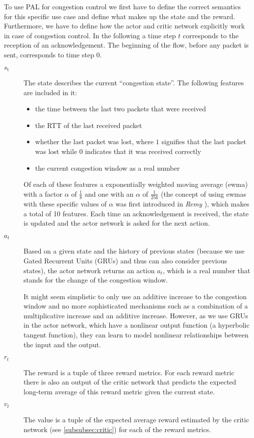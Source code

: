 \documentclass[sigconf]{acmart}
\begin{document}
To use PAL for congestion control we first have to define the correct semantics for this specific use case and define what makes up the state and the reward. Furthermore, we have to define how the actor and critic network explicitly work in case of congestion control. In the following a time step $t$ corresponds to the reception of an acknowledgement. The beginning of the flow, before any packet is sent, corresponds to time step $0$.

\begin{description}
\item[$\textit{s}_\text{t}$] The state  describes the current ``congestion state''. The following features are included in it:
\begin{itemize}
\item the time between the last two packets that were received
\item the RTT of the last received packet
\item whether the last packet was lost, where $1$ signifies that the last packet was lost while $0$ indicates that it was received correctly
\item the current congestion window as a real number
\end{itemize}
Of each of these features a exponentially weighted moving average (ewma) with a factor $\alpha$ of $\frac{1}{8}$ and one with an $\alpha$ of $\frac{1}{256}$ (the concept of using ewmas with these specific values of $\alpha$ was first introduced in \textit{Remy} \cite{winstein_tcp_2013}), which makes a total of 10 features.  
Each time an acknowledgement is received, the state is updated and the actor network is asked for the next action.
\item[$\textit{a}_t$] Based on a given state and the history of previous states (because we use Gated Recurrent Units (GRUs) and thus can also consider previous states), the actor network returns an action $a_t$, which is a real number that stands for the change of the congestion window. 

It might seem simplistic to only use an additive increase to the congestion window and no more sophisticated mechanisms such as a combination of a multiplicative increase and an additive increase. However, as we use GRUs in the actor network, which have a nonlinear output function (a hyperbolic tangent function), they can learn to model nonlinear relationships between the input and the output.  
\item[$\textit{r}_t$] The reward is a tuple of three reward metrics. 
For each reward metric there is also an output of the critic network that predicts the expected long-term average of this reward metric given the current state. 
\item[$\textit{v}_t$] The value is a tuple of the expected average reward estimated by the critic network (see \autoref{subsubsec:critic}) for each of the reward metrics. 
\end{description}
\end{document}
